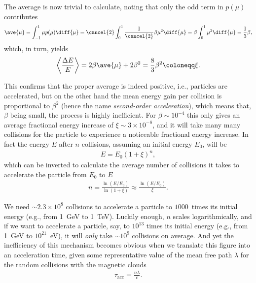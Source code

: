The average is now trivial to calculate, noting that only the odd term in $p(\mu)$
contributes
\begin{align*}
  \ave{\mu} = \int_{-1}^1 \mu p(\mu) \diff{\mu} =
  \cancel{2} \int_{0}^1 \frac{1}{\cancel{2}} \beta \mu^2 \diff{\mu} =
  \beta \int_0^1 \mu^2 \diff{\mu} =
  \frac{1}{3} \beta,
\end{align*}
which, in turn, yields
\begin{align}\label{eq:fermi_average}
  \left< \frac{\Delta E}{E} \right> = 2 \beta \ave{\mu} + 2 \beta^2 =
  \frac{8}{3} \beta^2 \coloneqq \xi.
\end{align}

This confirms that the proper average is indeed positive, i.e., particles are accelerated,
but on the other hand the mean energy gain per collision is proportional to $\beta^2$
(hence the name \emph{second-order acceleration}), which means that, $\beta$ being
small, the process is highly inefficient. For $\beta \sim 10^{-4}$ this only gives
an average fractional energy increase of $\xi \sim 3 \times 10^{-8}$, and it will
take many many collisions for the particle to experience a noticeable fractional
energy increase. In fact the energy $E$ after $n$ collisions, assuming an initial
energy $E_0$, will be
\begin{align*}
  E = E_0 \left( 1 + \xi \right)^n,
\end{align*}
which can be inverted to calculate the average number of collisions it takes to
accelerate the particle from $E_0$ to $E$
\begin{align}\label{eq:fermi_accel_num_collisions}
  n = \frac{\ln(E / E_0)}{\ln(1 + \xi)} \approx \frac{\ln(E / E_0)}{\xi}.
\end{align}

\begin{marginfigure}
  
  \caption{Characteristic cosmic-ray escape and acceleration time as a function
  of energy. Here we assume $\tau_\text{esc} = 80$~Myr at 10~GeV, decreasing
  with energy as $(\nicefrac{E}{E_0})^{-\delta}$ and a collision mean free path
  of 0.1~pc. The shaded band indicates the interval $\delta = 0.3$--$0.6$.}
  \label{fig:fermi_accel_efficiency}
\end{marginfigure}

We need $\sim 2.3 \times 10^8$ collisions to accelerate a particle to $1000$~times
its initial energy (e.g., from 1~GeV to 1~TeV). Luckily enough, $n$ scales logarithmically,
and if we want to accelerate a particle, say, to $10^{13}$ times its initial energy
(e.g., from 1~GeV to $10^{21}$~eV), it will \emph{only} take $\sim 10^9$ collisions
on average. And yet the inefficiency of this mechanism becomes obvious when we translate
this figure into an acceleration time, given some representative value of the mean
free path $\lambda$ for the random collisions with the magnetic clouds
\begin{align*}
  \tau_\text{acc} = \frac{n \lambda}{c}.
\end{align*}

